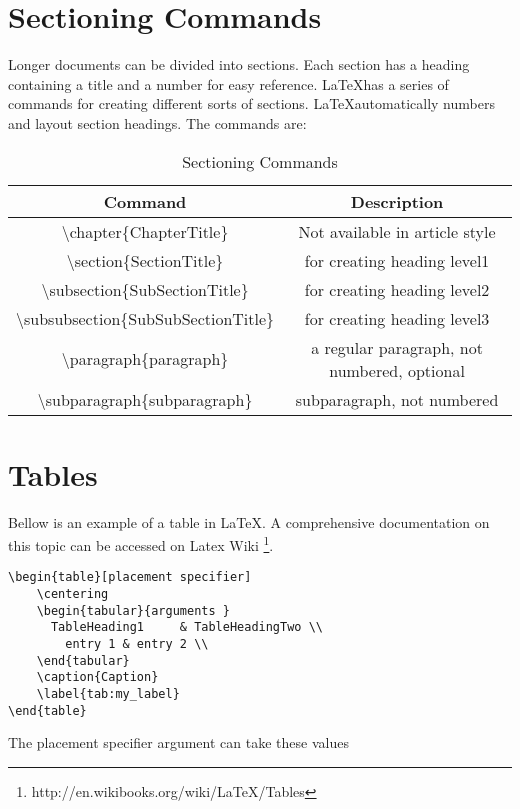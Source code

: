 \section{Sectioning Commands}
Longer documents can be divided into sections. Each section has a heading containing a title and a number for easy reference. \LaTeX has a series of commands for creating different sorts of sections.  \LaTeX automatically numbers and layout section headings.
The commands  are:
\begin{table}[h]
\centering
\begin{tabular}{c|c}
 Command & Description  \\ \hline
 \textbackslash chapter\{ChapterTitle\} & Not available in article style \\
 \textbackslash section\{SectionTitle\} & for creating heading level1 \\
 \textbackslash subsection\{SubSectionTitle\} & for creating heading level2 \\
 \textbackslash subsubsection\{SubSubSectionTitle\} & for creating heading level3 \\
 \textbackslash paragraph\{paragraph\} & a regular paragraph, not numbered, optional  \\
 \textbackslash subparagraph\{subparagraph\} & subparagraph, not numbered  \\
\end{tabular}
\caption{Sectioning Commands}
\label{tab:section}
\end{table}
\section{Tables}
Bellow is an example of a table in \LaTeX. A comprehensive documentation on this topic can be accessed on Latex Wiki
 \footnote{http://en.wikibooks.org/wiki/LaTeX/Tables}.

\begin{lstlisting}
\begin{table}[placement specifier]
    \centering
    \begin{tabular}{arguments }
      TableHeading1     & TableHeadingTwo \\
        entry 1 & entry 2 \\
    \end{tabular}
    \caption{Caption}
    \label{tab:my_label}
\end{table}
\end{lstlisting}

The placement specifier argument can take these values

